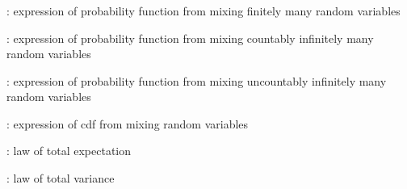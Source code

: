 \subsubsection*{}
\item {}: expression of probability function from
mixing finitely many random variables
\item {}: expression of probability function from
mixing countably infinitely many random variables
\item {}: expression of probability function from
mixing uncountably infinitely many random variables
\item {}: expression of cdf from mixing random variables
\item {}: law of total expectation
\item {}: law of total variance
